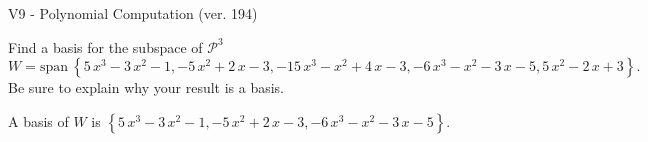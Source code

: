 \begin{exercise}
  \begin{exerciseTitle}V9 - Polynomial Computation (ver. 194)\end{exerciseTitle}
  \begin{exerciseStatement}
    Find a basis for the subspace of \(\mathcal{P}^3\) 
\[W=\mathrm{span}\ \left\{5 \, x^{3} - 3 \, x^{2} - 1 , -5 \, x^{2} + 2 \, x - 3 , -15 \, x^{3} - x^{2} + 4 \, x - 3 , -6 \, x^{3} - x^{2} - 3 \, x - 5 , 5 \, x^{2} - 2 \, x + 3\right\}.\]
 Be sure to explain why your result is a basis.


  \end{exerciseStatement}
  \begin{exerciseAnswer}
   A basis of \(W\) is  \(\left\{5 \, x^{3} - 3 \, x^{2} - 1 , -5 \, x^{2} + 2 \, x - 3 , -6 \, x^{3} - x^{2} - 3 \, x - 5\right\}\).
  


  \end{exerciseAnswer}
\end{exercise}